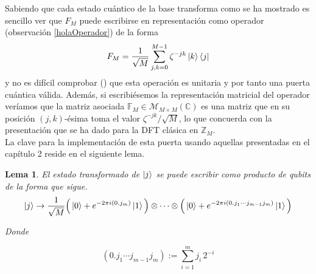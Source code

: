 \documentclass[11pt, spanish]{report}
\numberwithin{equation}{section}
\newtheorem{lema}[defin]{Lema}
\numberwithin{defin}{section}
\newenvironment{yellowBox}{\begin{tcolorbox}[colback=yellow!5!white,colframe=yellow!75!black]}{\end{tcolorbox}}
\begin{document}
Sabiendo que cada estado cuántico de la base transforma como se ha mostrado es sencillo ver que $F_M$ puede escribirse en representación como operador (observación \ref{holaOperador}) de la forma
\begin{equation*}
F_M=\frac{1}{\sqrt{M}}\sum_{j,k=0}^{M-1}\zeta^{-jk}\ket{k}\bra{j}
\end{equation*}
y no es difícil comprobar (\cite{shor}) que esta operación es unitaria y por tanto una puerta cuántica válida. Además, si escribiésemos la representación matricial del operador veríamos que la matriz asociada $\mathbb{F}_M\in \mathcal{M}_{M\times M}(\mathbb{C})$ es una matriz que en su posición $(j,k)$-ésima toma el valor $\zeta^{-jk}/\sqrt{M}$, lo que concuerda con la presentación que se ha dado para la DFT clásica en $\mathbb{Z}_M$.\\

La clave para la implementación de esta puerta usando aquellas presentadas en el capítulo 2 reside en el siguiente lema.\\


\begin{yellowBox}
\begin{lema}El estado transformado de $\ket{j}$ se puede escribir como producto de qubits de la forma que sigue.
\begin{equation}
\ket{j}\rightarrow \frac{1}{\sqrt{M}}\Big(\ket{0}+e^{-2\pi i (0.j_m)}\ket{1}\Big)\otimes \cdots \otimes \Big(\ket{0}+e^{-2\pi i (0.j_1\cdots j_{m-1}j_m)}\ket{1}\Big)
\end{equation}

Donde

\begin{equation}
(0.j_1\cdots j_{m-1}j_m):=\sum_{i=1}^m j_i\, 2^{-i}
\end{equation}
\end{lema}
\end{yellowBox}
\end{document}
